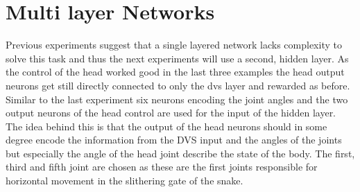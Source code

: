\section{Multi layer Networks}
Previous experiments suggest that a single layered network lacks complexity to solve this task and thus the next experiments will use a second, hidden layer. As the control of the head worked good in the last three examples the head output neurons get still directly connected to only the dvs layer and rewarded as before. Similar to the last experiment six neurons encoding the joint angles and the two output neurons of the head control are used for the input of the hidden layer. The idea behind this is that the output of the head neurons should in some degree encode the information from the DVS input and the angles of the joints but especially the angle of the head joint describe the state of the body. The first, third and fifth joint are chosen as these are the first joints responsible for horizontal movement in the slithering gate of the snake.

